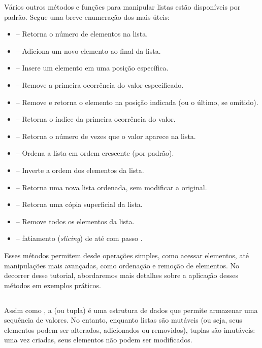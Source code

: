 Vários outros métodos e funções para manipular listas estão disponíveis por padrão. Segue uma breve enumeração dos mais úteis:
\begin{itemize}
\item {} – Retorna o número de elementos na lista.
\item {} -- Adiciona um novo elemento ao final da lista.
\item {} -- Insere um elemento em uma posição específica.
\item {} -- Remove a primeira ocorrência do valor especificado.
\item {} -- Remove e retorna o elemento na posição indicada (ou o último, se omitido).
\item {} -- Retorna o índice da primeira ocorrência do valor.
\item {} -- Retorna o número de vezes que o valor aparece na lista.
\item {} – Ordena a lista em ordem crescente (por padrão).
\item {} -- Inverte a ordem dos elementos da lista.
\item {} -- Retorna uma nova lista ordenada, sem modificar a original.
\item {} -- Retorna uma cópia superficial da lista.
\item {} -- Remove todos os elementos da lista.
\item {} -- fatiamento (\emph{slicing}) de  até  com passo .
\end{itemize}

Esses métodos permitem desde operações simples, como acessar elementos, até manipulações mais avançadas,
como ordenação e remoção de elementos.
No decorrer desse tutorial, abordaremos mais detalhes sobre a aplicação desses métodos em exemplos práticos.


\subsection{}

Assim como , a  (ou tupla) é uma estrutura de dados que permite armazenar uma sequência
de valores.
No entanto, enquanto listas são mutáveis (ou seja, seus elementos podem ser alterados, adicionados ou removidos),
tuplas são imutáveis: uma vez criadas, seus elementos não podem ser modificados.

